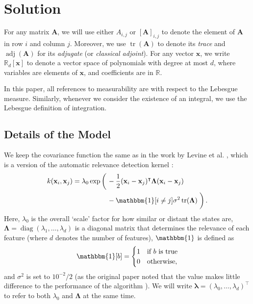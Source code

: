 \documentclass{mpaper}
\DeclareMathOperator{\diag}{diag}
\DeclareMathOperator{\adj}{adj}
\DeclareMathOperator{\tr}{tr}
\begin{document}
\section{Solution}

For any matrix $\mathbf{A}$, we will use either $A_{i,j}$ or
$[\mathbf{A}]_{i,j}$ to denote the element of $\mathbf{A}$ in row $i$ and column
$j$. Moreover, we use $\tr(\mathbf{A})$ to denote its \emph{trace} and
$\adj(\mathbf{A})$ for its \emph{adjugate} (or \emph{classical adjoint}). For
any vector $\mathbf{x}$, we write $\mathbb{R}_d[\mathbf{x}]$ to denote a vector
space of polynomials with degree at most $d$, where variables are elements of
$\mathbf{x}$, and coefficients are in $\mathbb{R}$.

In this paper, all references to measurability are with respect to the Lebesgue
measure. Similarly, whenever we consider the existence of an integral, we use
the Lebesgue definition of integration.

\subsection{Details of the Model}

We keep the covariance function the same as in the work by Levine et al.
\cite{DBLP:conf/nips/LevinePK11}, which is a version of the automatic relevance
detection kernel \cite{DBLP:conf/nips/LevinePK11,neal2012bayesian}:
\begin{align*}
  k(\mathbf{x}_i, \mathbf{x}_j) = \lambda_0\exp\left( \vphantom{\frac{1}{2}} \right. &-\frac{1}{2}(\mathbf{x}_i - \mathbf{x}_j)^\intercal\bm\Lambda(\mathbf{x}_i - \mathbf{x}_j) \\
                                                                                     &- \mathbbm{1}[i \ne j]\sigma^2\tr(\bm\Lambda) \left. \vphantom{\frac{1}{2}} \right).
\end{align*}
Here, $\lambda_0$ is the overall `scale' factor for how similar or distant the
states are, $\bm\Lambda = \diag(\lambda_1, \dots, \lambda_d)$ is a diagonal
matrix that determines the relevance of each feature (where $d$ denotes the
number of features), $\mathbbm{1}$ is defined as
\[
  \mathbbm{1}[b] = \begin{cases}
    1 & \mbox{if $b$ is true} \\
    0 & \mbox{otherwise},
  \end{cases}
\]
and $\sigma^2$ is set to $10^{-2}/2$ (as the original paper noted that
the value makes little difference to the performance of the algorithm
\cite{DBLP:conf/nips/LevinePK11}). We will write $\bm\lambda = (\lambda_0,
\dots, \lambda_d)^\intercal$ to refer to both $\lambda_0$ and $\bm\Lambda$ at
the same time.
\end{document}
